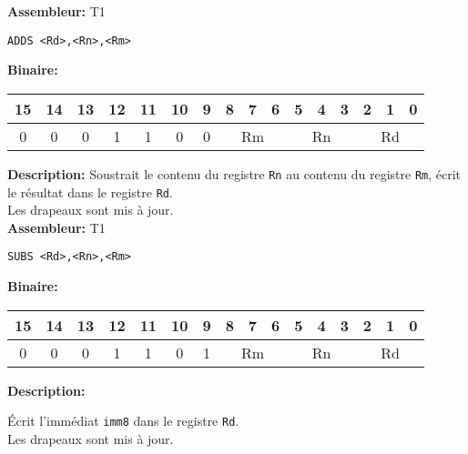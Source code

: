 \documentclass{article}
\newcounter{subsubsubsection}[subsubsection]
\begin{document}
\textbf{Assembleur:} T1

\begin{lstlisting}
ADDS <Rd>,<Rn>,<Rm>
\end{lstlisting}

\textbf{Binaire:}\\

\begin{tabular}{| c c c c c c c c c c c c c c c c |}
\hline
15 & 14 & 13 & \multicolumn{1}{|c}{12} & 11 & \multicolumn{1}{|c}{10} & \multicolumn{1}{|c}{9} & \multicolumn{1}{|c}{8} & 7 & 6 & \multicolumn{1}{|c}{5} & 4 & 3 & \multicolumn{1}{|c}{2} & 1 & 0 \\
\hline   
0 & 0 & 0 & \multicolumn{1}{|c}{1} & 1 &  \multicolumn{1}{|c}{0} & \multicolumn{1}{|c}{0} & \multicolumn{3}{|c|}{Rm} & \multicolumn{3}{|c|}{Rn} & \multicolumn{3}{|c|}{Rd} \\
\hline
\end{tabular}



\textbf{Description: }
Soustrait le contenu du registre \texttt{Rn} au contenu du registre \texttt{Rm}, écrit le résultat dans le registre \texttt{Rd}.\\
Les drapeaux sont mis à jour.\\

\textbf{Assembleur:} T1

\begin{lstlisting}
SUBS <Rd>,<Rn>,<Rm>
\end{lstlisting}

\textbf{Binaire:}\\

\begin{tabular}{| c c c c c c c c c c c c c c c c |}
\hline
15 & 14 & 13 & \multicolumn{1}{|c}{12} & 11 & \multicolumn{1}{|c}{10} & \multicolumn{1}{|c}{9} & \multicolumn{1}{|c}{8} & 7 & 6 & \multicolumn{1}{|c}{5} & 4 & 3 & \multicolumn{1}{|c}{2} & 1 & 0 \\
\hline   
0 & 0 & 0 & \multicolumn{1}{|c}{1} & 1 &  \multicolumn{1}{|c}{0} & \multicolumn{1}{|c}{1} & \multicolumn{3}{|c|}{Rm} & \multicolumn{3}{|c|}{Rn} & \multicolumn{3}{|c|}{Rd} \\
\hline
\end{tabular}


\textbf{Description: }

Écrit l'immédiat \texttt{imm8} dans le registre \texttt{Rd}.\\
Les drapeaux sont mis à jour.\\
\end{document}
